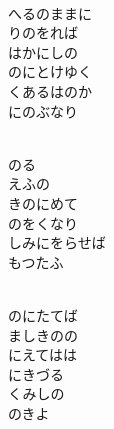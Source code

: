 \documentclass[10pt,b5j]{tarticle} %
\begin{document}
\vspace{1.5em} %
\newcommand{\linespace}{0.5em} %
\newcommand{\blocksize}{0.5\hsize} %
\newcommand{\itemmargin}{3em} %
\begin{enumerate} %
    \setlength{\itemindent}{\itemmargin} %
    \begin{minipage}[c]{\blocksize}
    
        \vspace{\linespace}
        \item~\\
        へるのままに\\
        りのをれば\\
        はかにしの\\
        のにとけゆく\\
        くあるはのか\\
        にのぶなり
        
    \end{minipage}
    \begin{minipage}[c]{\blocksize}
        
        \vspace{\linespace}
        \item~\\
        のる\\
        えふの\\
        きのにめて\\
        のをくなり\\
        しみにをらせば\\
        もつたふ
        
    \end{minipage}
    \begin{minipage}[c]{\blocksize}
        
        \vspace{\linespace}
        \item~\\
        のにたてば\\
        ましきのの\\
        にえてはは\\
        にきづる\\
        くみしの\\
        のきよ
        

\end{minipage}
\end{enumerate}
\end{document}
